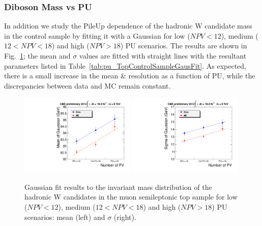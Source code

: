 \subsubsection{Diboson Mass vs PU}
In addition we study the PileUp dependence of the hadronic W candidate mass in the control sample by fitting it with a Gaussian for low ($NPV<12$), medium ($12<NPV<18$) and high ($NPV>18$) PU scenarios. The results are shown in Fig.~\ref{fig:pu_TopControlSampleGausFit}; the mean and $\sigma$ values are fitted with straight lines with the resultant parameters listed in Table~\ref{tab:pu_TopControlSampleGausFit}. As expected, there is a small increase in the mean \& resolution as a function of PU, while the discrepancies between data and MC remain constant.
\begin{figure}[htb] 
  {\centering
    \includegraphics[width=0.49\textwidth]{figs/puchecks/DibosonMassVsPU_mean.pdf}
    \includegraphics[width=0.49\textwidth]{figs/puchecks/DibosonMassVsPU_sigma.pdf}
    \caption{Gaussian fit results to the invariant mass distribution of the hadronic 
      W candidates in the muon semileptonic top sample for low ($NPV<12$), medium ($12<NPV<18$) and high ($NPV>18$) PU scenarios: mean (left) and $\sigma$ (right).}
    \label{fig:pu_TopControlSampleGausFit}}
\end{figure}
